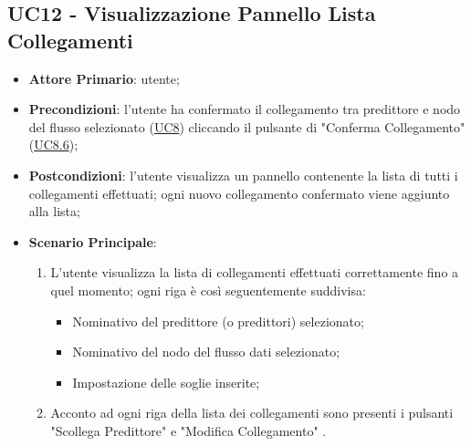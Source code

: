 	\subsection{UC12 - Visualizzazione Pannello Lista Collegamenti}
		\begin{itemize}
			\item\textbf{Attore Primario}: utente;
			\item\textbf{Precondizioni}: l’utente ha confermato il collegamento tra predittore e nodo del flusso selezionato  (\hyperref[par:UC8]{UC8}) cliccando il pulsante di "Conferma Collegamento"(\hyperref[par:UC8.6]{UC8.6});
			\item\textbf{Postcondizioni}: l’utente visualizza un pannello contenente la lista di tutti i collegamenti effettuati; ogni nuovo collegamento confermato viene aggiunto alla lista; 
			\item\textbf{Scenario Principale}: 
				\begin{enumerate} 
					\item L'utente visualizza la lista di collegamenti effettuati correttamente fino a quel momento; ogni riga è così seguentemente suddivisa:
					\begin{itemize}
						\item Nominativo del predittore (o predittori) selezionato;
						\item Nominativo del nodo del flusso dati selezionato;
						\item Impostazione delle soglie inserite;
					\end{itemize}
					\item Acconto ad ogni riga della lista dei collegamenti sono presenti i pulsanti "Scollega Predittore" e "Modifica Collegamento" .	
				\end{enumerate}		
		\end{itemize}


	\label{par:UC13}
